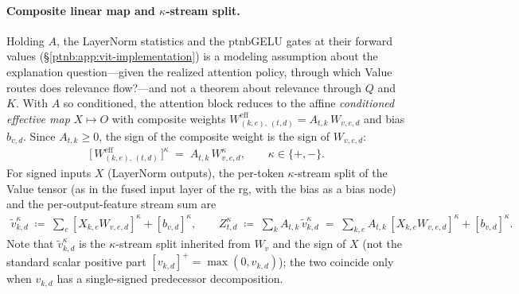 \paragraph{Composite linear map and $\kappa$-stream split.} Holding $A$, the LayerNorm statistics and the \acs{ptnbGELU} gates at their forward values
(\S\ref{ptnb:app:vit-implementation}) is a modeling assumption about the explanation question---given
the realized attention policy, through which Value routes does relevance flow?---and not a theorem
about relevance through $Q$ and $K$.  With $A$ so conditioned, the attention block reduces to the
affine \emph{conditioned effective map} $X \mapsto O$ with composite weights
$W^{\mathrm{eff}}_{(k,e),\,(t,d)} = A_{t,k}\, W_{v,e,d}$ and bias $b_{v,d}$. Since $A_{t,k} \ge 0$,
the sign of the composite weight is the sign of $W_{v,e,d}$:
\begin{align}\label{ptnb:eq:attn-composite-weight}
    \bigl[\,W^{\mathrm{eff}}_{(k,e),\,(t,d)}\,\bigr]^\kappa
    \;=\; A_{t,k}\, W_{v,e,d}^\kappa,
    \qquad \kappa \in \{+,-\}.
\end{align}
For signed inputs $X$ (LayerNorm outputs), the per-token $\kappa$-stream split of the Value tensor
(as in the fused input layer of the \ac{rg}, with the bias as a bias node) and the
per-output-feature stream sum are
\begin{align}\label{ptnb:eq:attn-Z-def}
    \tilde{v}_{k,d}^\kappa \;\coloneqq\; \sum_e [X_{k,e} W_{v,e,d}]^\kappa + [b_{v,d}]^\kappa,
    \qquad
    Z_{t,d}^\kappa \;\coloneqq\; \sum_{k} A_{t,k}\, \tilde{v}_{k,d}^\kappa
    \;=\; \sum_{k,e} A_{t,k}\, [X_{k,e} W_{v,e,d}]^\kappa + [b_{v,d}]^\kappa.
\end{align}
Note that $\tilde{v}_{k,d}^\kappa$ is the $\kappa$-stream split inherited from $W_v$ and the sign
of $X$ (not the standard scalar positive part $[v_{k,d}]^+ = \max(0, v_{k,d})$); the two coincide
only when $v_{k,d}$ has a single-signed predecessor decomposition.

